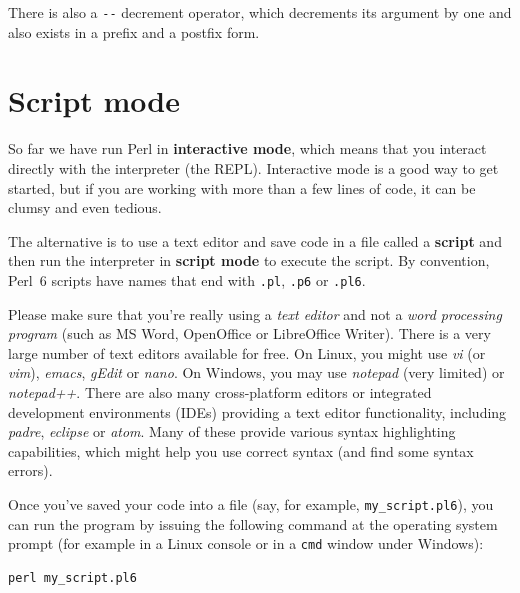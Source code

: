 There is also a \verb"--" 
decrement operator, which decrements its argument by one and also 
exists in a prefix and a postfix form. 



\section{Script mode}

So far we have run Perl in {\bf interactive mode}, which
means that you interact directly with the interpreter (the 
REPL). Interactive mode is a good way to get started,
but if you are working with more than a few lines of code, 
it can be clumsy and even tedious.

The alternative is to use a text editor and save code in a file 
called a {\bf script} and then run the interpreter in {\bf script mode} 
to execute the script.  By convention, Perl~6 scripts have names that 
end with {\tt .pl}, {\tt .p6} or {\tt .pl6}.

Please make sure that you're really using a \emph{text editor} 
and not a \emph{word processing program} (such as MS Word, 
OpenOffice or LibreOffice Writer). There is a very large 
number of text editors available for free. On Linux, you might use 
\emph{vi} (or \emph{vim}), \emph{emacs}, \emph{gEdit} or 
\emph{nano}. On Windows, you may use \emph{notepad} (very limited) 
or \emph{notepad++}. There are also many cross-platform editors  
or integrated development environments (IDEs) providing a 
text editor functionality, including \emph{padre}, \emph{eclipse} 
or \emph{atom}. Many of these provide various syntax highlighting 
capabilities, which might help you use correct syntax (and 
find some syntax errors).

Once you've saved your code into a file (say, for example, 
\verb'my_script.pl6'), you can run the program by issuing 
the following command at the operating system prompt (for example 
in a Linux console or in a \verb'cmd' window under Windows):
\begin{verbatim}
perl my_script.pl6
\end{verbatim}

